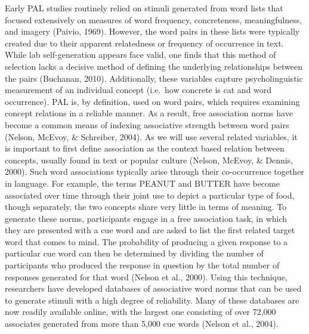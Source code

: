 \documentclass[english,man]{apa6}
\theoremstyle{definition}
\theoremstyle{definition}
\theoremstyle{remark}
\begin{document}
Early PAL studies routinely relied on stimuli generated from word lists
that focused extensively on measures of word frequency, concreteness,
meaningfulness, and imagery (Paivio, 1969). However, the word pairs in
these lists were typically created due to their apparent relatedness or
frequency of occurrence in text. While lab self-generation appears face
valid, one finds that this method of selection lacks a decisive method
of defining the underlying relationships between the pairs (Buchanan,
2010). Additionally, these variables capture psycholinguistic
measurement of an individual concept (i.e.~how concrete is cat and word
occurrence). PAL is, by definition, used on word pairs, which requires
examining concept relations in a reliable manner. As a result, free
association norms have become a common means of indexing associative
strength between word pairs (Nelson, McEvoy, \& Schreiber, 2004). As we
will use several related variables, it is important to first define
association as the context based relation between concepts, usually
found in text or popular culture (Nelson, McEvoy, \& Dennis, 2000). Such
word associations typically arise through their co-occurrence together
in language. For example, the terms PEANUT and BUTTER have become
associated over time through their joint use to depict a particular type
of food, though separately, the two concepts share very little in terms
of meaning. To generate these norms, participants engage in a free
association task, in which they are presented with a cue word and are
asked to list the first related target word that comes to mind. The
probability of producing a given response to a particular cue word can
then be determined by dividing the number of participants who produced
the response in question by the total number of responses generated for
that word (Nelson et al., 2000). Using this technique, researchers have
developed databases of associative word norms that can be used to
generate stimuli with a high degree of reliability. Many of these
databases are now readily available online, with the largest one
consisting of over 72,000 associates generated from more than 5,000 cue
words (Nelson et al., 2004).
\end{document}
